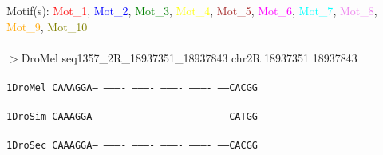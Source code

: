 \documentclass[11pt,twoside,reqno,a4paper]{article}
\begin{document}
\noindent
\newlength{\charwidth}Motif(s): \textcolor{red}{Mot\_1}, \textcolor{blue}{Mot\_2}, \textcolor{green}{Mot\_3}, \textcolor{yellow}{Mot\_4}, \textcolor{brown}{Mot\_5}, \textcolor{magenta}{Mot\_6}, \textcolor{cyan}{Mot\_7}, \textcolor{violet}{Mot\_8}, \textcolor{orange}{Mot\_9}, \textcolor{olive}{Mot\_10}\\
\\
$>$DroMel	seq1357\_2R\_18937351\_18937843	chr2R	18937351	18937843 \\
 \\
\texttt{1\hspace*{3\charwidth}DroMel	CAAAGGA---	----------	----------	----------	----------	-----CACGG	\\
\hspace*{4\charwidth}\hspace*{7\charwidth}\hspace*{1\charwidth}\hspace*{1\charwidth}\hspace*{1\charwidth}\hspace*{1\charwidth}\hspace*{1\charwidth}\hspace*{1\charwidth}\\
1\hspace*{3\charwidth}DroSim	CAAAGGA---	----------	----------	----------	----------	-----CATGG	\\
\hspace*{4\charwidth}\hspace*{7\charwidth}\hspace*{1\charwidth}\hspace*{1\charwidth}\hspace*{1\charwidth}\hspace*{1\charwidth}\hspace*{1\charwidth}\hspace*{1\charwidth}\\
1\hspace*{3\charwidth}DroSec	CAAAGGA---	----------	----------	----------	----------	-----CACGG	\\
\hspace*{4\charwidth}\hspace*{7\charwidth}\hspace*{1\charwidth}\hspace*{1\charwidth}\hspace*{1\charwidth}\hspace*{1\charwidth}\hspace*{1\charwidth}\hspace*{1\charwidth}\\
}
\end{document}
